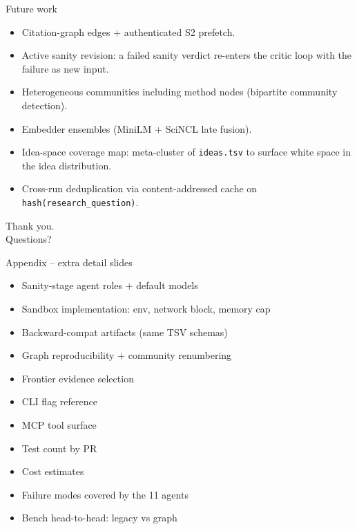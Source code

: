 \documentclass[10pt,aspectratio=169]{beamer}
\begin{document}
\begin{frame}{Future work}
  \begin{itemize}
    \item Citation-graph edges + authenticated S2 prefetch.
    \item Active sanity revision: a failed sanity verdict re-enters the
      critic loop with the failure as new input.
    \item Heterogeneous communities including method nodes
      (bipartite community detection).
    \item Embedder ensembles (MiniLM + SciNCL late fusion).
    \item Idea-space coverage map: meta-cluster of \texttt{ideas.tsv} to
      surface white space in the idea distribution.
    \item Cross-run deduplication via content-addressed cache on
      \texttt{hash(research\_question)}.
  \end{itemize}
\end{frame}

\begin{frame}[standout]
  Thank you.\\[1em]
  \normalsize Questions?
\end{frame}

\appendix

\begin{frame}{Appendix -- extra detail slides}
  \begin{itemize}
    \item Sanity-stage agent roles + default models
    \item Sandbox implementation: env, network block, memory cap
    \item Backward-compat artifacts (same TSV schemas)
    \item Graph reproducibility + community renumbering
    \item Frontier evidence selection
    \item CLI flag reference
    \item MCP tool surface
    \item Test count by PR
    \item Cost estimates
    \item Failure modes covered by the 11 agents
    \item Bench head-to-head: legacy vs graph
  \end{itemize}
\end{frame}
\end{document}
